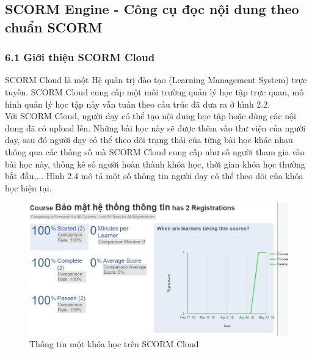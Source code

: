 \subsection{SCORM Engine - Công cụ đọc nội dung theo chuẩn SCORM}
\subsubsection{6.1 Giới thiệu SCORM Cloud}
SCORM Cloud là một Hệ quản trị đào tạo (Learning Management System) trực tuyến. SCORM Cloud cung cấp một môi trường quản lý học tập trực quan, mô hình quản lý học tập này vẫn tuân theo cấu trúc đã đưa ra ở hình 2.2.\\

Với SCORM Cloud, người dạy có thể tạo nội dung học tập hoặc dùng các nội dung đã có upload lên. Những bài học này sẽ được thêm vào thư viện của người dạy, sau đó người dạy có thể theo dõi trạng thái của từng bài học khác nhau thông qua các thông số mà SCORM Cloud cung cấp như số người tham gia vào bài học này, thống kê số người hoàn thành khóa học, thời gian khóa học thường bắt đầu,... Hình 2.4 mô tả một số thông tin người dạy có thể theo dõi của khóa học hiện tại.\\

\vspace{0.5cm}

\begin{center}
	\begin{figure}[htp]
		\begin{center}
			\includegraphics[width=15cm]{Chapter2/Pictures/picture24.jpg}
		\end{center}
		\caption{Thông tin một khóa học trên SCORM Cloud}
		\label{refpicture24}
	\end{figure}
\end{center}
\newpage

